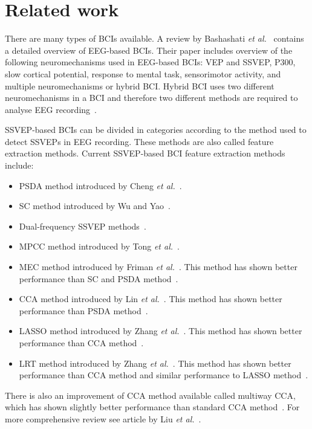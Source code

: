 
\section{Related work}

There are many types of \glspl{BCI} available. A review by Bashashati \textit{et al.}~\cite{bci_comparison} contains a detailed overview of \gls{EEG}-based \glspl{BCI}. Their paper includes overview of the following neuromechanisms used in \gls{EEG}-based \glspl{BCI}: \gls{VEP} and \gls{SSVEP}, P300, slow cortical potential, response to mental task, sensorimotor activity, and multiple neuromechanisms or hybrid \gls{BCI}. Hybrid \gls{BCI} uses two different neuromechanisms in a \gls{BCI} and therefore two different methods are required to analyse \gls{EEG} recording~\cite{hybrid_bci, hybrid_bci2}. %

\gls{SSVEP}-based \glspl{BCI} can be divided in categories according to the method used to detect \glspl{SSVEP} in \gls{EEG} recording. These methods are also called \gls{feature extraction} methods. Current \gls{SSVEP}-based \gls{BCI} \gls{feature extraction} methods include:
\begin{itemize}
	\item \Gls{PSDA} method introduced by Cheng \textit{et al.}~\cite{psda}.
	\item \Gls{SC} method introduced by Wu and Yao~\cite{sc}.
	\item Dual-frequency \gls{SSVEP} methods~\cite{dual1, dual2}.
	\item \Gls{MPCC} method introduced by Tong \textit{et al.}~\cite{MPCC}.
	\item \Gls{MEC} method introduced by Friman \textit{et al.}~\cite{mec}. This method has shown better performance than \gls{SC} and \gls{PSDA} method~\cite{mec_comparison}.
	\item \Gls{CCA} method introduced by Lin \textit{et al.}~\cite{cca_lin}. This method has shown better performance than \gls{PSDA} method~\cite{cca_psda, bin2009cca, cca_lin}.
	\item \Gls{LASSO} method introduced by Zhang \textit{et al.}~\cite{LASSO}. This method has shown better performance than \gls{CCA} method~\cite{LASSO}.
	\item \Gls{LRT} method introduced by Zhang \textit{et al.}~\cite{LRT}. This method has shown better performance than \gls{CCA} method and similar performance to \gls{LASSO} method~\cite{LRT}.
\end{itemize}
There is also an improvement of \gls{CCA} method available called multiway \gls{CCA}, which has shown slightly better performance than standard \gls{CCA} method~\cite{mcca}. For more comprehensive review see article by Liu \textit{et al.}~\cite{feature_extraction}.

